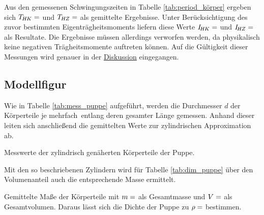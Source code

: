 Aus den gemessenen Schwingungszeiten in Tabelle \ref{tab:period_körper} ergeben sich
$T_{\hspace{-0.15ex}H\hspace{-0.15ex}K} = $ und
$T_{\hspace{-0.15ex}H\hspace{-0.15ex}Z} = $ als gemittelte Ergebnisse. Unter Berücksichtigung
des zuvor bestimmten Eigenträgheitsmoments liefern diese Werte
$I_{\hspace{-0.3ex}H\hspace{-0.15ex}K} = $ und
$I_{\hspace{-0.3ex}H\hspace{-0.15ex}Z} = $ als Resultate. Die Ergebnisse
müssen allerdings verworfen werden, da physikalisch keine negativen Trägheitsmomente auftreten können. Auf die
Gültigkeit dieser Messungen wird genauer in der \hyperref[sec:diskussion]{Diskussion} eingegangen.

\newpage

\subsection{Modellfigur}

Wie in Tabelle \ref{tab:mess_puppe} aufgeführt, werden die Durchmesser $d$ der Körperteile je mehrfach~entlang deren gesamter
Länge gemessen. Anhand dieser leiten sich anschließend die gemittelten Werte zur zylindrischen Approximation ab.

\begin{table}[H]
	\centering
	\caption{Messwerte der zylindrisch genäherten Körperteile der Puppe.}
	
	\label{tab:mess_puppe}
\end{table}

Mit den so beschriebenen Zylindern wird für Tabelle \ref{tab:dim_puppe} über den Volumenanteil auch die entsprechende Masse
ermittelt.

\begin{table}
	\centering
	\captionsetup{width=0.875\linewidth}
	\caption{Gemittelte Maße der Körperteile mit $m = \protect$ als Gesamtmasse und
			 $V = \protect$ als Gesamtvolumen. Daraus lässt sich die Dichte der Puppe
			 zu $\rho = \protect$ bestimmen.}
	
	\label{tab:dim_puppe}
\end{table}

